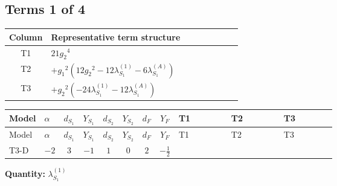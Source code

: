 \documentclass[8pt]{article}
\begin{document}
\begin{landscape}
\subsection*{Terms 1 of 4}
\begin{center}
\begin{tabular}{@{}c >{\raggedright\arraybackslash}p{0.82\linewidth}@{}}
\toprule
Column & Representative term structure \\
\midrule
T1 & \(\displaystyle 21 {g_2}^4\) \\
\midrule
T2 & \(\displaystyle +{g_1}^2 \left(12 {g_2}^2-12 {\lambda_{S_1}^{(1)}}-6 {\lambda_{S_1}^{(A)}}\right)\) \\
\midrule
T3 & \(\displaystyle +{g_2}^2 (-24 {\lambda_{S_1}^{(1)}}-12 {\lambda_{S_1}^{(A)}})\) \\
\midrule
\bottomrule
\end{tabular}
\end{center}
\smallskip
\tiny
\begin{longtable}{@{}llcccccc >{\raggedright\arraybackslash}p{0.21\linewidth} >{\raggedright\arraybackslash}p{0.21\linewidth} >{\raggedright\arraybackslash}p{0.21\linewidth}@{}}
\toprule
Model & $\alpha$ & $d_{S_1}$ & $Y_{S_1}$ & $d_{S_2}$ & $Y_{S_2}$ & $d_F$ & $Y_F$ & T1 & T2 & T3 \\
\midrule
\endfirsthead
\toprule
Model & $\alpha$ & $d_{S_1}$ & $Y_{S_1}$ & $d_{S_2}$ & $Y_{S_2}$ & $d_F$ & $Y_F$ & T1 & T2 & T3 \\
\midrule
\endhead
T3-D & $-2$ & $3$ & $-1$ & $1$ & $0$ & $2$ & $-\frac{1}{2}$ & \scriptsize\adjustbox{max width=\linewidth}{$\begin{gathered} 21 {g_2}^4\end{gathered}$} & \scriptsize\adjustbox{max width=\linewidth}{$\begin{gathered} +{g_1}^2 \left(12 {g_2}^2-12 {\lambda_{S_1}^{(1)}}-6 {\lambda_{S_1}^{(A)}}\right)\end{gathered}$} & \scriptsize\adjustbox{max width=\linewidth}{$\begin{gathered} +{g_2}^2 (-24 {\lambda_{S_1}^{(1)}}-12 {\lambda_{S_1}^{(A)}})\end{gathered}$} \\
\midrule
\bottomrule
\end{longtable}
\clearpage
\noindent\textbf{Quantity: }$\lambda_{S_1}^{(1)}$\par\smallskip

\end{landscape}
\end{document}
